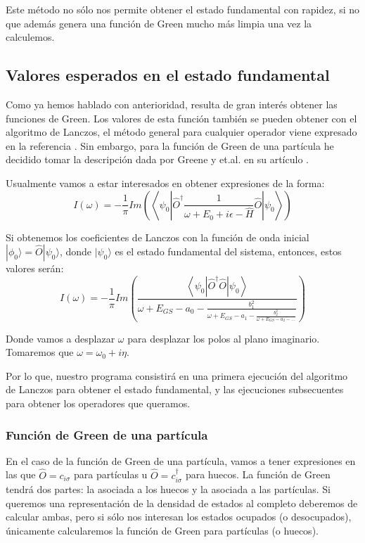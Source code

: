 \documentclass[12pt,twoside]{article}
\begin{document}
Este método no sólo nos permite obtener el estado fundamental con rapidez, si no que además genera una función de Green mucho más limpia una vez la calculemos.

\subsection{Valores esperados en el estado fundamental}

Como ya hemos hablado con anterioridad, resulta de gran interés obtener las funciones de Green. Los valores de esta función también se pueden obtener con el algoritmo de Lanczos, el método general para cualquier operador viene expresado en la referencia \cite{RevModPhys.66.763}. Sin embargo, para la función de Green de una partícula he decidido tomar la descripción dada por Greene y et.al. en su artículo \cite{GreeneDiniz2024}.

Usualmente vamos a estar interesados en obtener expresiones de la forma:
$$
I(\omega) = -\frac{1}{\pi}Im\left(\left\langle\psi_0 \left|\hat{O}^{\dagger}\frac{1}{\omega + E_0 + i\epsilon - \hat{H}}\hat{O}\right|\psi_0\right\rangle\right)
$$

Si obtenemos los coeficientes de Lanczos con la función de onda inicial $|\phi_0\rangle = \hat{O}|\psi_0\rangle$, donde $|\psi_0\rangle$ es el estado fundamental del sistema, entonces, estos valores serán:
\begin{equation}
  I(\omega) = -\frac{1}{\pi}Im\left( \frac{\left\langle\psi_0\left| \hat{O}^{\dagger}\hat{O}\right|\psi_0\right\rangle}{\omega + E_{GS} - a_0 - \frac{b_1^2}{\omega + E_{GS} - a_1 - \frac{b_2^2}{\omega + E_{GS} - a_2 - \ldots}}}\right)
\end{equation}

Donde vamos a desplazar $\omega$ para desplazar los polos al plano imaginario. Tomaremos que $\omega = \omega_0 + i\eta$.

Por lo que, nuestro programa consistirá en una primera ejecución del algoritmo de Lanczos para obtener el estado fundamental, y las ejecuciones subsecuentes para obtener los operadores que queramos.
\subsubsection{Función de Green de una partícula}

En el caso de la función de Green de una partícula, vamos a tener expresiones en las que $\hat{O} = c_{i\sigma}$ para partículas u $\hat{O} = c_{i\sigma}^{\dagger}$ para huecos. La función de Green tendrá dos partes: la asociada a los huecos y la asociada a las partículas. Si queremos una representación de la densidad de estados al completo deberemos de calcular ambas, pero si sólo nos interesan los estados ocupados (o desocupados), únicamente calcularemos la función de Green para partículas (o huecos).
\end{document}
